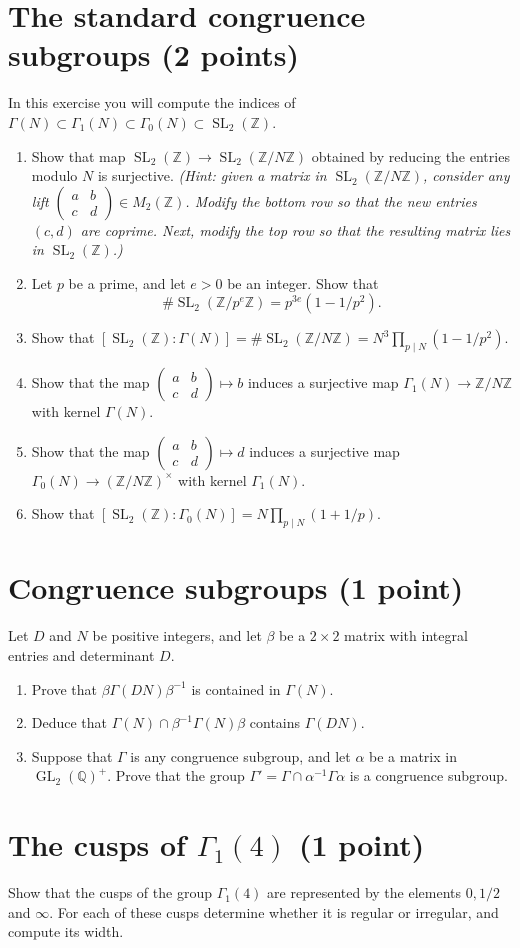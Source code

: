 \documentclass[paper=a4, fontsize=11pt]{scrartcl} %
\numberwithin{equation}{section} %
\numberwithin{figure}{section} %
\numberwithin{table}{section} %
\newcommand{\bbQ}{\mathbb{Q}}
\newcommand{\bbZ}{\mathbb{Z}}
\newcommand{\QQ}{\bbQ}
\newcommand{\ZZ}{\bbZ}
\DeclareMathOperator{\GL}{GL}
\DeclareMathOperator{\SL}{SL}
\newcommand{\smtx}[4]{\left(\begin{smallmatrix}#1&#2\\#3&#4\end{smallmatrix}\right)}
\begin{document}
\section{The standard congruence subgroups (2 points)}
In this exercise you will compute the indices of $\Gamma(N)\subset \Gamma_1(N)\subset \Gamma_0(N)\subset \SL_2(\ZZ)$.
\begin{enumerate}
\item Show that map $\SL_2(\ZZ)\to\SL_2(\ZZ/N\ZZ)$ obtained by reducing the entries modulo $N$ is surjective. \emph{(Hint: given a matrix in $\SL_2(\ZZ/N\ZZ)$, consider any lift $\smtx abcd\in M_2(\ZZ)$. Modify the bottom row so that the new entries $(c,d)$ are coprime. Next, modify the top row so that the resulting matrix lies in $\SL_2(\ZZ)$.)}
\item Let $p$ be a prime, and let $e>0$ be an integer. Show that
\[
\#\SL_2(\ZZ/p^e\ZZ)=p^{3e}(1-1/p^2).
\]
\item Show that $[\SL_2(\ZZ)\colon \Gamma(N)]=\#\SL_2(\ZZ/N\ZZ) = N^3\prod_{p\mid N} (1-1/p^2)$.
\item Show that the map $\smtx abcd\mapsto b$ induces a surjective map $\Gamma_1(N)\to \ZZ/N\ZZ$ with kernel $\Gamma(N)$.
\item Show that the map $\smtx abcd\mapsto d$ induces a surjective map $\Gamma_0(N)\to (\ZZ/N\ZZ)^\times$ with kernel $\Gamma_1(N)$.
\item Show that $[\SL_2(\ZZ)\colon \Gamma_0(N)] = N\prod_{p\mid N} (1+1/p)$.
\end{enumerate}
\section{Congruence subgroups (1 point)}
Let $D$ and $N$ be positive integers, and let $\beta$ be a $2\times 2$ matrix with integral entries and determinant $D$.
\begin{enumerate}
\item Prove that $\beta\Gamma(DN)\beta^{-1}$ is contained in $\Gamma(N)$.
\item Deduce that $\Gamma(N)\cap\beta^{-1}\Gamma(N)\beta$ contains $\Gamma(DN)$.
\item Suppose that $\Gamma$ is any congruence subgroup, and let $\alpha$ be a matrix in $\GL_2(\QQ)^+$. Prove that the group $\Gamma'=\Gamma\cap \alpha^{-1}\Gamma\alpha$ is a congruence subgroup.
\end{enumerate}

\section{The cusps of $\Gamma_1(4)$ (1 point)}
Show that the cusps of the group $\Gamma_1(4)$ are represented by the elements $0, 1/2$ and $\infty$. For each of these cusps determine whether it is regular or irregular, and compute its width.
\end{document}
